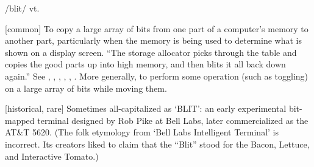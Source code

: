  /blit/ vt.

\begin{inparaenum}
\item {[}common] To copy a large array of bits from one part of a computer's
    memory to another part, particularly when the memory is being used to
    determine what is shown on a display screen. ``The storage allocator picks
    through the table and copies the good parts up into high memory, and then
    blits it all back down again.'' See , ,
    , , , . More
    generally, to perform some operation (such as toggling) on a large array of
    bits while moving them.
\item {[}historical, rare] Sometimes all-capitalized as `BLIT': an early
    experimental bit-mapped terminal designed by Rob Pike at Bell Labs, later
    commercialized as the AT\&T 5620. (The folk etymology from `Bell Labs
    Intelligent Terminal' is incorrect. Its creators liked to claim that the
    ``Blit'' stood for the Bacon, Lettuce, and Interactive Tomato.)
\end{inparaenum}

